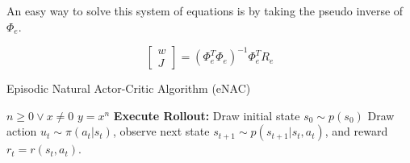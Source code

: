 \noindent An easy way to solve this system of equations is by taking the pseudo inverse of $\Phi_e$.

\begin{equation}
	\begin{bmatrix} w\\J \end{bmatrix} = (\Phi_e^T \Phi_e)^{-1} \Phi_e^T R_e
\end{equation}

\begin{algorithm}
	\caption{Episodic Natural Actor-Critic Algorithm (eNAC)}\label{euclid}
	\begin{algorithmic}
		\REQUIRE $n \geq 0 \vee x \neq 0$
		\ENSURE $y = x^n$
				\STATE \textbf{Execute Rollout:} Draw initial state $s_0 \sim p(s_0)$
					\STATE Draw action $u_t\sim\pi(a_t|s_t)$, observe next state $s_{t+1} \sim p(s_{t+1}|s_t, a_t)$, and reward $r_t = r(s_t, a_t)$.
				\ENDFOR
			\ENDFOR
		\ENDFOR
	\end{algorithmic}
\end{algorithm}




